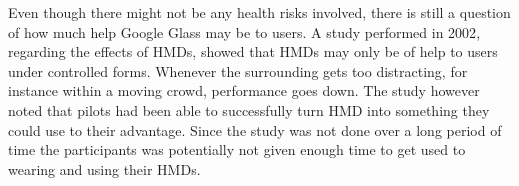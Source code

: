 %
Even though there might not be any health risks involved, there is still a question of how much help Google Glass may be to users. A study performed in 2002\cite{laramee02}, regarding the effects of HMDs, showed that HMDs may only be of help to users under controlled forms. Whenever the surrounding gets too distracting, for instance within a moving crowd, performance goes down. The study however noted that pilots had been able to successfully turn HMD into something they could use to their advantage. Since the study was not done over a long period of time the participants was potentially not given enough time to get used to wearing and using their HMDs.

